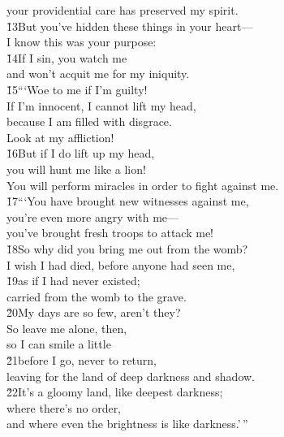 \begin{poetry}
\poemll    your providential care has preserved my spirit. \\
\poeml \v{13}But you've hidden these things in your heart--- \\
\poemll    I know this was your purpose: \\
\poeml \v{14}If I sin, you watch me \\
\poemll    and won't acquit me for my iniquity. \\
\poeml \v{15}```Woe to me if I'm guilty! \\
\poemll    If I'm innocent, I cannot lift my head, \\
\poeml because I am filled with disgrace. \\
\poemll    Look at my affliction! \\
\poeml \v{16}But if I do lift up my head, \\
\poemll    you will hunt me like a lion! \\
\poemlll       You will perform miracles in order to fight against me. \\
\poeml \v{17}```You have brought new witnesses against me, \\
\poemll    you're even more angry with me--- \\
\poemlll       you've brought fresh troops to attack me! \\
\poeml \v{18}So why did you bring me out from the womb? \\
\poemll    I wish I had died, before anyone had seen me, \\
\poeml \v{19}as if I had never existed; \\
\poemll    carried from the womb to the grave. \\
\poeml \v{20}My days are so few, aren't they? \\
\poemll    So leave me alone, then, \\
\poemlll       so I can smile a little \\
\poeml \v{21}before I go, never to return, \\
\poemll    leaving for the land of deep darkness and shadow. \\
\poeml \v{22}It's a gloomy land, like deepest darkness; \\
\poemll    where there's no order, \\
\poemlll       and where even the brightness is like darkness.'\,''
\end{poetry}

